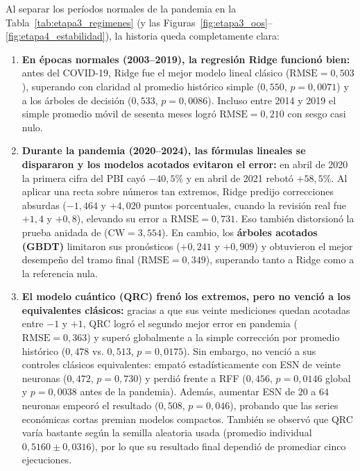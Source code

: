 Al separar los períodos normales de la pandemia en la Tabla~\ref{tab:etapa3_regimenes} (y las Figuras~\ref{fig:etapa3_oos}--\ref{fig:etapa4_estabilidad}), la historia queda completamente clara:
\begin{enumerate}
	\item \textbf{En épocas normales (2003--2019), la regresión Ridge funcionó bien:} antes del COVID-19, Ridge fue el mejor modelo lineal clásico (\(\text{RMSE}=0{,}503\)), superando con claridad al promedio histórico simple (\(0{,}550\), \(p=0{,}0071\)) y a los árboles de decisión (\(0{,}533\), \(p=0{,}0086\)). Incluso entre 2014 y 2019 el simple promedio móvil de sesenta meses logró \(\text{RMSE}=0{,}210\) con sesgo casi nulo.
	\item \textbf{Durante la pandemia (2020--2024), las fórmulas lineales se dispararon y los modelos acotados evitaron el error:} en abril de 2020 la primera cifra del PBI cayó \(-40{,}5\%\) y en abril de 2021 rebotó \(+58{,}5\%\). Al aplicar una recta sobre números tan extremos, Ridge predijo correcciones absurdas (\(-1{,}464\) y \(+4{,}020\) puntos porcentuales, cuando la revisión real fue \(+1{,}4\) y \(+0{,}8\)), elevando su error a \(\text{RMSE}=0{,}731\). Eso también distorsionó la prueba anidada de \textcite{clark2007} (\(\text{CW}=3{,}554\)). En cambio, los \textbf{árboles acotados (GBDT)} limitaron sus pronósticos (\(+0{,}241\) y \(+0{,}909\)) y obtuvieron el mejor desempeño del tramo final (\(\text{RMSE}=0{,}349\)), superando tanto a Ridge como a la referencia nula.
	\item \textbf{El modelo cuántico (QRC) frenó los extremos, pero no venció a los equivalentes clásicos:} gracias a que sus veinte mediciones quedan acotadas entre \(-1\) y \(+1\), QRC logró el segundo mejor error en pandemia (\(\text{RMSE}=0{,}363\)) y superó globalmente a la simple corrección por promedio histórico (\(0{,}478\) vs. \(0{,}513\), \(p=0{,}0175\)). Sin embargo, no venció a sus controles clásicos equivalentes: empató estadísticamente con ESN de veinte neuronas (\(0{,}472\), \(p=0{,}730\)) y perdió frente a RFF (\(0{,}456\), \(p=0{,}0146\) global y \(p=0{,}0038\) antes de la pandemia). Además, aumentar ESN de \(20\) a \(64\) neuronas empeoró el resultado (\(0{,}508\), \(p=0{,}046\)), probando que las series económicas cortas premian modelos compactos. También se observó que QRC varía bastante según la semilla aleatoria usada (promedio individual \(0{,}5160 \pm 0{,}0316\)), por lo que su resultado final dependió de promediar cinco ejecuciones.
\end{enumerate}

